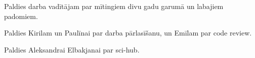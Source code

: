 Paldies darba vadītājam par mītingiem divu gadu garumā un labajiem padomiem.

\noindent Paldies Kirilam un Paulīnai par darba pārlasīšanu, un Emīlam par code review.

\noindent Paldies Aleksandrai Elbakjanai par sci-hub.